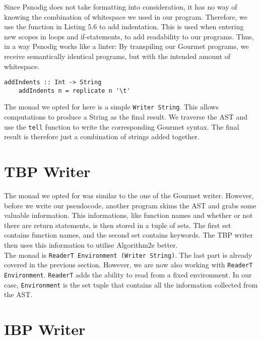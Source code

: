 Since Psnodig does not take formatting into consideration, it has no way of knowing the combination of whitespace we used in our program. Therefore, we use the function in Listing 5.6 to add indentation. This is used when entering new scopes in loops and if-statements, to add readability to our programs. Thus, in a way Psnodig works like a linter: By transpiling our Gourmet programs, we receive semantically identical programs, but with the intended amount of whitespace. \hfill \\

\begin{lstlisting}[caption={A function for adding indentation}, captionpos=b]
    addIndents :: Int -> String
    addIndents n = replicate n '\t'
\end{lstlisting}

The monad we opted for here is a simple \texttt{Writer String}. This allows computations to produce a String as the final result. We traverse the AST and use the \texttt{tell} function to write the corresponding Gourmet syntax. The final result is therefore just a combination of strings added together.

\section{TBP Writer}

The monad we opted for was similar to the one of the Gourmet writer. However, before we write our pseudocode, another program skims the AST and grabs some valuable information. This informations, like function names and whether or not there are return statements, is then stored in a tuple of sets. The first set contains function names, and the second set contains keywords. The TBP writer then uses this information to utilise Algorithm2e better. \hfill \\

The monad is \texttt{ReaderT Environment (Writer String)}. The last part is already covered in the previous section. However, we are now also working with \texttt{ReaderT Environment}. \texttt{ReaderT} adds the ability to read from a fixed environment. In our case, \texttt{Environment} is the set tuple that contains all the information collected from the AST.

\section{IBP Writer}

